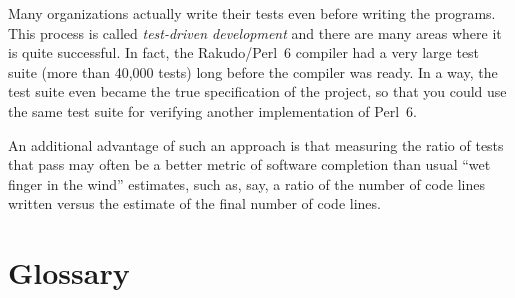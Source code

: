 Many organizations actually write their tests even before 
writing the programs. This process is called 
\emph{test-driven development} and there are many areas where 
it is quite successful. In fact, the Rakudo/Perl~6 compiler 
had a very large test suite (more than 40,000 tests) long 
before the compiler was ready. In a way, the test suite 
even became the true specification of the project, so that 
you could use the same test suite for verifying another 
implementation of Perl~6.

An additional advantage of 
such an approach is that measuring the ratio of tests that 
pass may often be a better metric of software completion than  
usual ``wet finger in the wind'' estimates, such as, say, a ratio of 
the number of code lines written versus the estimate of 
the final number of code lines.

\section{Glossary}

